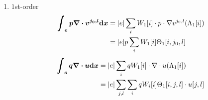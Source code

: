 \begin{enumerate}
  \item $1$st-order
    \begin{equation}\label{eq:integral-pgv}
      \begin{split}
        \bm{\int_e p\nabla\cdot v^{j_0,l}\mathrm{d} x} &= |e| \sum_i W_1[i]\cdot p\cdot 
        \nabla v^{j_0,l}(\Lambda_1[i]) \\
        &= |e| p\sum_i W_1[i] \Theta_1[i,j_0,l]
      \end{split}
    \end{equation}
    \begin{equation}\label{eq:integral-qgu}
      \begin{split}
        \bm{\int_e q\nabla\cdot u\mathrm{d} x} &= |e| \sum_i qW_1[i]\cdot 
        \nabla \cdot u(\Lambda_1[i]) \\
        &= |e| \sum_{j,l}\sum_{i} qW_i[i]\Theta_1[i,j,l]\cdot u[j,l]
      \end{split}
    \end{equation}
\end{enumerate}
